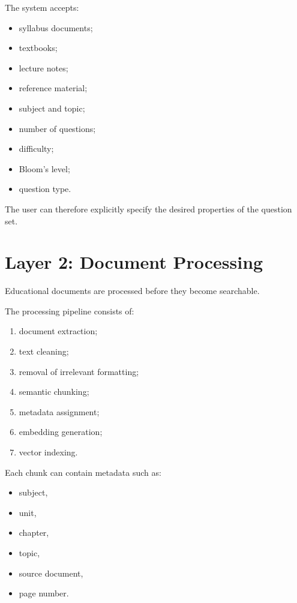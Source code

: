 \documentclass[12pt,a4paper]{report}
\begin{document}
The system accepts:

\begin{itemize}
    \item syllabus documents;
    \item textbooks;
    \item lecture notes;
    \item reference material;
    \item subject and topic;
    \item number of questions;
    \item difficulty;
    \item Bloom's level;
    \item question type.
\end{itemize}

The user can therefore explicitly specify the desired properties of the question set.

\section{Layer 2: Document Processing}

Educational documents are processed before they become searchable.

The processing pipeline consists of:

\begin{enumerate}
    \item document extraction;
    \item text cleaning;
    \item removal of irrelevant formatting;
    \item semantic chunking;
    \item metadata assignment;
    \item embedding generation;
    \item vector indexing.
\end{enumerate}

Each chunk can contain metadata such as:

\begin{itemize}
    \item subject,
    \item unit,
    \item chapter,
    \item topic,
    \item source document,
    \item page number.
\end{itemize}
\end{document}
